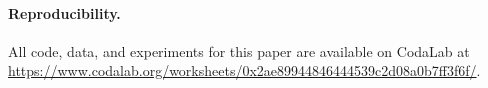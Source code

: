 \paragraph{Reproducibility.}
All code, data, and experiments for this paper are available on CodaLab at
{\small \url{https://www.codalab.org/worksheets/0x2ae89944846444539c2d08a0b7ff3f6f/}}.





